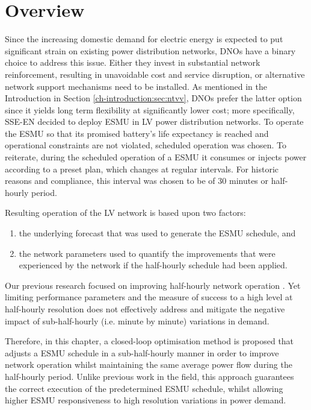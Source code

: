 \section{Overview}
\label{ch1:sec:overview}

Since the increasing domestic demand for electric energy is expected to put significant strain on existing power distribution networks, DNOs have a binary choice to address this issue.
Either they invest in substantial network reinforcement, resulting in unavoidable cost and service disruption, or alternative network support mechanisms need to be installed.
As mentioned in the Introduction in Section \ref{ch-introduction:sec:ntvv}, DNOs prefer the latter option since it yields long term flexibility at significantly lower cost; more specifically, SSE-EN decided to deploy ESMU in LV power distribution networks.
To operate the ESMU so that its promised battery's life expectancy is reached and operational constraints are not violated, scheduled operation was chosen.
To reiterate, during the scheduled operation of a ESMU it consumes or injects power according to a preset plan, which changes at regular intervals.
For historic reasons and compliance, this interval was chosen to be of 30 minutes or half-hourly period.

Resulting operation of the LV network is based upon two factors:

\begin{enumerate}
	\item the underlying forecast that was used to generate the ESMU schedule, and
	\item the network parameters used to quantify the improvements that were experienced by the network if the half-hourly schedule had been applied.
\end{enumerate}

Our previous research focused on improving half-hourly network operation \cite{Rowe2014a, Yunusov2011}.
Yet limiting performance parameters and the measure of success to a high level at half-hourly resolution does not effectively address and mitigate the negative impact of sub-half-hourly (i.e. minute by minute) variations in demand.

Therefore, in this chapter, a closed-loop optimisation method is proposed that adjusts a ESMU schedule in a sub-half-hourly manner in order to improve network operation whilst maintaining the same average power flow during the half-hourly period.
Unlike previous work in the field, this approach guarantees the correct execution of the predetermined ESMU schedule, whilst allowing higher ESMU responsiveness to high resolution variations in power demand.

